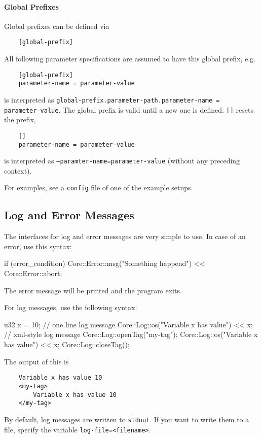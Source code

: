 \paragraph{Global Prefixes}
Global prefixes can be defined via
\begin{verbatim}
    [global-prefix]
\end{verbatim}
All following parameter specifications are assumed to have this global prefix, e.g.
\begin{verbatim}
    [global-prefix]
    parameter-name = parameter-value
\end{verbatim}
is interpreted as \texttt{global-prefix.parameter-path.parameter-name = parameter-value}.
The global prefix is valid until a new one is defined. \texttt{[]} resets the prefix, \ie
\begin{verbatim}
    []
    parameter-name = parameter-value
\end{verbatim}
is interpreted as \texttt{--paramter-name=parameter-value} (without any preceding context).

For examples, see a \texttt{config} file of one of the example setups.


\subsection{Log and Error Messages}


The interfaces for log and error messages are very simple to use. In case of an error, use this syntax:
\begin{code}
    if (error_condition) {
        Core::Error::msg("Something happend") << Core::Error::abort;
    }
\end{code}
The error message will be printed and the program exits.

For log messages, use the following syntax:
\begin{code}
    u32 x = 10;
    // one line log message
    Core::Log::os("Variable x has value") << x;
    // xml-style log message
    Core::Log::openTag("my-tag");
    Core::Log::os("Variable x has value") << x;
    Core::Log::closeTag();
\end{code}
The output of this is
\begin{verbatim}
    Variable x has value 10
    <my-tag>
        Variable x has value 10
    </my-tag>
\end{verbatim}
By default, log messages are written to \texttt{stdout}. If you want to write them to a file, specify the variable \texttt{log-file=<filename>}.



